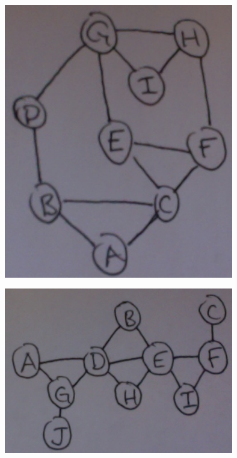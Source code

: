 \documentclass[solution, letterpaper]{cs121}
\begin{document}
\begin{empfile}
\subproblem %

\begin{center}
\includegraphics[width=100mm]{undirected_graph_a.png}
\end{center}

\begin{center}
\includegraphics[width=100mm]{undirected_graph_b.png}
\end{center}


\end{empfile}
\end{document}
